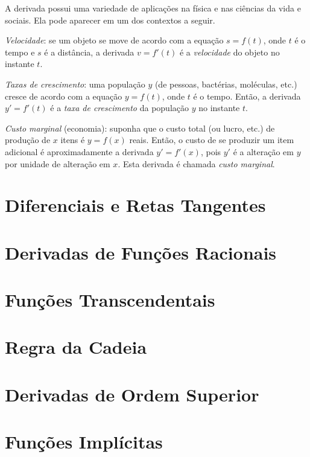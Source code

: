 
A derivada possui uma variedade de aplicações na física e nas ciências
da vida e sociais. Ela pode aparecer em um dos contextos a seguir.

\emph{Velocidade}: se um objeto se move de acordo com a equação $s = f(t)$,
onde $t$ é o tempo e $s$ é a distância, a derivada $v = f'(t)$ é a
\emph{velocidade} do objeto no instante $t$.

\emph{Taxas de crescimento}: uma população $y$ (de pessoas, bactérias,
moléculas, etc.) cresce de acordo com a equação $y = f(t)$, onde $t$ é
o tempo. Então, a derivada $y' = f'(t)$ é a \emph{taxa de crescimento}
da população $y$ no instante $t$.

\emph{Custo marginal} (economia): suponha que o custo total (ou lucro,
etc.) de produção de $x$ itens é $y = f(x)$ reais. Então, o custo de
se produzir um item adicional é aproximadamente a derivada $y' = f'(x)$,
pois $y'$ é a alteração em $y$ por unidade de alteração em $x$. Esta
derivada é chamada \emph{custo marginal}.

\section{Diferenciais e Retas Tangentes}
\label{sec:tglines}

\section{Derivadas de Funções Racionais}
\label{sec:derivratfunc}

\section{Funções Transcendentais}
\label{sec:transcfunc}

\section{Regra da Cadeia}
\label{sec:chainrule}

\section{Derivadas de Ordem Superior}
\label{sec:higherderivs}

\section{Funções Implícitas}
\label{sec:implicitfunc}

\begin{chapterproblems}
\end{chapterproblems}


